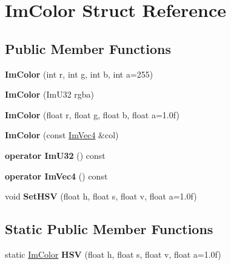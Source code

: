\hypertarget{struct_im_color}{}\section{Im\+Color Struct Reference}
\label{struct_im_color}
\subsection*{Public Member Functions}
\begin{DoxyCompactItemize}
\item 
\mbox{\label{struct_im_color_ab4ba02f8290d5dadc1ebc57b2c8a9cbe}} 
{\bfseries Im\+Color} (int r, int g, int b, int a=255)
\item 
\mbox{\label{struct_im_color_ad306332841a2b1f903f40262a19f9412}} 
{\bfseries Im\+Color} (Im\+U32 rgba)
\item 
\mbox{\label{struct_im_color_a92b53917ca9d90a7207b18270ff5453d}} 
{\bfseries Im\+Color} (float r, float g, float b, float a=1.\+0f)
\item 
\mbox{\label{struct_im_color_aa5306926b3ef766a8647b26bdfd9f8d2}} 
{\bfseries Im\+Color} (const \hyperlink{struct_im_vec4}{Im\+Vec4} \&col)
\item 
\mbox{\label{struct_im_color_a4f4fc53e0676d50404d6d5ffcf16637f}} 
{\bfseries operator Im\+U32} () const
\item 
\mbox{\label{struct_im_color_a10f1de242f13c93f8be64545e4cbcb0a}} 
{\bfseries operator Im\+Vec4} () const
\item 
\mbox{\label{struct_im_color_afcff20160db703b956d56e5a9fa88e24}} 
void {\bfseries Set\+H\+SV} (float h, float s, float v, float a=1.\+0f)
\end{DoxyCompactItemize}
\subsection*{Static Public Member Functions}
\begin{DoxyCompactItemize}
\item 
\mbox{\label{struct_im_color_ac8cb52119648523038818a613becf010}} 
static \hyperlink{struct_im_color}{Im\+Color} {\bfseries H\+SV} (float h, float s, float v, float a=1.\+0f)
\end{DoxyCompactItemize}

